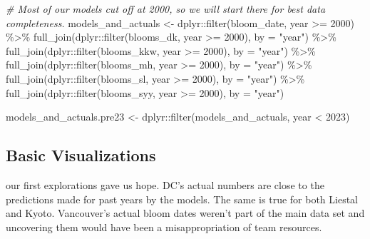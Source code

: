 \documentclass[
]{article}
\newenvironment{Shaded}{\begin{snugshade}}{\end{snugshade}}
\newcommand{\AttributeTok}[1]{\textcolor[rgb]{0.77,0.63,0.00}{#1}}
\newcommand{\CommentTok}[1]{\textcolor[rgb]{0.56,0.35,0.01}{\textit{#1}}}
\newcommand{\DecValTok}[1]{\textcolor[rgb]{0.00,0.00,0.81}{#1}}
\newcommand{\FunctionTok}[1]{\textcolor[rgb]{0.00,0.00,0.00}{#1}}
\newcommand{\NormalTok}[1]{#1}
\newcommand{\OtherTok}[1]{\textcolor[rgb]{0.56,0.35,0.01}{#1}}
\newcommand{\SpecialCharTok}[1]{\textcolor[rgb]{0.00,0.00,0.00}{#1}}
\newcommand{\StringTok}[1]{\textcolor[rgb]{0.31,0.60,0.02}{#1}}
\begin{document}
\begin{Shaded}
\begin{Highlighting}[]
\CommentTok{\# Most of our models cut off at 2000, so we will start there for best data completeness. }
\NormalTok{models\_and\_actuals }\OtherTok{\textless{}{-}}\NormalTok{ dplyr}\SpecialCharTok{::}\FunctionTok{filter}\NormalTok{(bloom\_date, year }\SpecialCharTok{\textgreater{}=} \DecValTok{2000}\NormalTok{) }\SpecialCharTok{\%\textgreater{}\%} 
  \FunctionTok{full\_join}\NormalTok{(dplyr}\SpecialCharTok{::}\FunctionTok{filter}\NormalTok{(blooms\_dk, year }\SpecialCharTok{\textgreater{}=} \DecValTok{2000}\NormalTok{), }\AttributeTok{by =} \StringTok{"year"}\NormalTok{) }\SpecialCharTok{\%\textgreater{}\%}
  \FunctionTok{full\_join}\NormalTok{(dplyr}\SpecialCharTok{::}\FunctionTok{filter}\NormalTok{(blooms\_kkw, year }\SpecialCharTok{\textgreater{}=} \DecValTok{2000}\NormalTok{), }\AttributeTok{by =} \StringTok{"year"}\NormalTok{) }\SpecialCharTok{\%\textgreater{}\%}
  \FunctionTok{full\_join}\NormalTok{(dplyr}\SpecialCharTok{::}\FunctionTok{filter}\NormalTok{(blooms\_mh, year }\SpecialCharTok{\textgreater{}=} \DecValTok{2000}\NormalTok{), }\AttributeTok{by =} \StringTok{"year"}\NormalTok{) }\SpecialCharTok{\%\textgreater{}\%}
  \FunctionTok{full\_join}\NormalTok{(dplyr}\SpecialCharTok{::}\FunctionTok{filter}\NormalTok{(blooms\_sl, year }\SpecialCharTok{\textgreater{}=} \DecValTok{2000}\NormalTok{), }\AttributeTok{by =} \StringTok{"year"}\NormalTok{) }\SpecialCharTok{\%\textgreater{}\%}
  \FunctionTok{full\_join}\NormalTok{(dplyr}\SpecialCharTok{::}\FunctionTok{filter}\NormalTok{(blooms\_syy, year }\SpecialCharTok{\textgreater{}=} \DecValTok{2000}\NormalTok{), }\AttributeTok{by =} \StringTok{"year"}\NormalTok{)}

\NormalTok{models\_and\_actuals.pre23 }\OtherTok{\textless{}{-}}\NormalTok{ dplyr}\SpecialCharTok{::}\FunctionTok{filter}\NormalTok{(models\_and\_actuals, year }\SpecialCharTok{\textless{}} \DecValTok{2023}\NormalTok{)}
\end{Highlighting}
\end{Shaded}

\hypertarget{basic-visualizations}{%
\subsection{Basic Visualizations}\label{basic-visualizations}}

our first explorations gave us hope. DC's actual numbers are close to
the predictions made for past years by the models. The same is true for
both Liestal and Kyoto. Vancouver's actual bloom dates weren't part of
the main data set and uncovering them would have been a misappropriation
of team resources.
\end{document}
